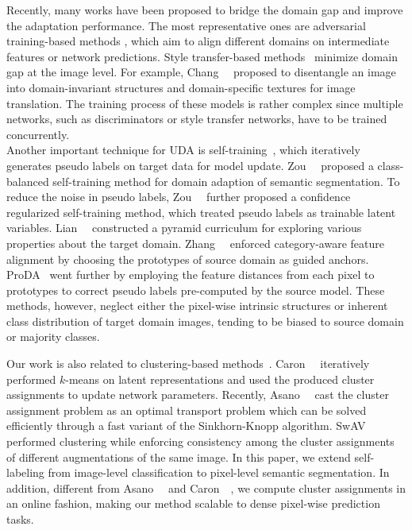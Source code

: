 \documentclass[10pt,twocolumn,letterpaper]{article}
\begin{document}
	 Recently, many works have been proposed to bridge the domain gap and improve the adaptation performance. The most representative ones are adversarial training-based methods \cite{kim2020learning,hong2018conditional,pan2020unsupervised,tsai2018learning,tsai2019domain}, which aim to align different domains on intermediate features or network predictions. Style transfer-based methods~\cite{chang2019all,chen2019crdoco,choi2019self,wu2018dcan,yang2020fda} minimize domain gap at the image level. For example, Chang~\etal~\cite{chang2019all} proposed to disentangle an image into domain-invariant structures and domain-specific textures for image translation. The training process of these models is rather complex since multiple networks, such as discriminators or style transfer networks, have to be trained concurrently.\\
	\indent Another important technique for UDA is self-training~\cite{zou2018domain,zou2019confidence,lian2019constructing,zhang2019category,melas2021pixmatch,li2021t}, which iteratively generates pseudo labels on target data for model update. Zou~\etal~\cite{zou2018domain} proposed a class-balanced self-training method for domain adaption of semantic segmentation. To reduce the noise in pseudo labels, Zou~\etal~\cite{zou2019confidence} further proposed a confidence regularized self-training method, which treated pseudo labels as trainable latent variables. Lian~\etal~\cite{lian2019constructing} constructed a pyramid curriculum for exploring various properties about the target domain. Zhang~\etal~\cite{zhang2019category} enforced category-aware feature alignment by choosing the prototypes of source domain as guided anchors. ProDA~\cite{zhang2021prototypical} went further by employing the feature distances from each pixel to prototypes to correct pseudo labels pre-computed by the source model. These methods, however, neglect either the pixel-wise intrinsic structures or inherent class distribution of target domain images, tending to be biased to source domain or majority classes.


	 Our work is also related to clustering-based methods~\cite{asano2020self,bautista2016cliquecnn,caron2018deep,huang2019unsupervised,xie2016unsupervised,yan2020clusterfit,yang2016joint,zhuang2019local,asano2020labelling}. Caron~\etal~\cite{caron2018deep} iteratively performed $k$-means on latent representations and used the produced cluster assignments to update network parameters. Recently, Asano~\etal~\cite{asano2020self} cast the cluster assignment problem as an optimal transport problem which can be solved efficiently through a fast variant of the Sinkhorn-Knopp algorithm. SwAV~\cite{caron2020unsupervised} performed clustering while enforcing consistency among the cluster assignments of different augmentations of the same image. In this paper, we extend self-labeling from image-level classification to pixel-level semantic segmentation. In addition, different from Asano~\etal~\cite{asano2020self} and Caron~\etal~\cite{caron2018deep}, we compute cluster assignments in an online fashion, making our method scalable to dense pixel-wise prediction tasks. 
\end{document}
